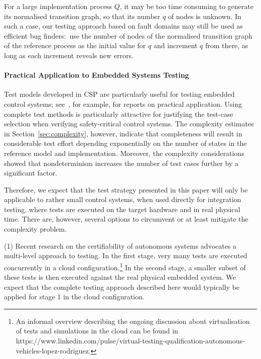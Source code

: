 \documentclass[3p,times]{elsarticle}
\begin{document}
For a large implementation process $Q$, it may be too time consuming to
generate its normalised transition graph, so that its number $q$ of nodes is
unknown. In such a case, our testing approach based on fault domains may
still be used as efficient bug finders:~use the number of nodes of the
normalised transition graph of the reference process as the initial value for
$q$ and increment $q$ from there, as long as each increment reveals new
errors.



\paragraph{Practical Application to Embedded Systems Testing}

Test models developed in  CSP  are particularly useful for testing embedded
control systems; see~\cite{peleska2002tocs,Peleska02}, for example, for
reports on practical application. Using complete test methods is particularly
attractive for justifying the test-case selection when verifying
safety-critical control systems. The complexity estimates in
Section~\ref{sec:complexity}, however, indicate that completeness will result
in considerable test effort depending exponentially on the number of states
in the reference model and implementation. Moreover, the complexity
considerations showed that nondeterminism increases the number of test cases
further by a significant factor.

Therefore, we expect that the test strategy presented in this paper will only
be applicable to rather small control systems, when used directly for
integration testing, where tests are executed on the target hardware and in
real physical time. There are, however, several options to circumvent or at
least mitigate the complexity problem.

\medskip
\noindent (1) Recent research on the certifiability of autonomous systems
advocates a multi-level approach to testing. In the first stage, very many
tests  are executed concurrently in a cloud configuration.\footnote{An
informal overview describing the ongoing discussion about virtualisation of
tests and simulations in the cloud can be found in
https://www.linkedin.com/pulse/virtual-testing-qualification-autonomous-vehicles-lopez-rodriguez.}
In the second stage, a smaller subset of these tests is then executed against
the real physical embedded system. We expect that the complete testing
approach described here would typically be applied for stage 1 in the cloud
configuration.
\end{document}
